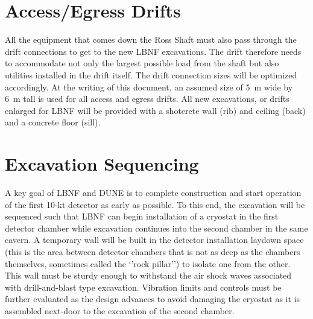 \section{Access/Egress Drifts}
\label{sec:fscf-excav-access-drifts}

All the equipment that comes down the Ross Shaft must also pass through the drift connections to get to the new LBNF excavations. The drift therefore needs to accommodate not only the largest possible load from the shaft but also utilities installed in the drift itself. The drift connection sizes will be optimized accordingly. 
At the writing of this document, an assumed size of 5~m wide by 6~m tall is used for all access and egress drifts. All new excavations, or drifts enlarged for LBNF will be provided with a shotcrete wall (rib) and ceiling (back) and a concrete floor (sill).

\section{Excavation Sequencing}
\label{sec:fscf-excav-exc-seq}

A key goal of LBNF and DUNE is to complete construction and start operation of the first 10-kt detector as early as possible. To %
this end, the excavation will be sequenced such that LBNF can begin installation of a cryostat in the first detector chamber while excavation continues into the second chamber in the same cavern.  A temporary wall will be built in the detector installation laydown space (this is the area between detector chambers that is not as deep as the chambers themselves, sometimes called the `'rock pillar'') to isolate one  from the other. 
This wall must be %
sturdy enough to withstand the air shock waves associated with drill-and-blast type %
excavation.  %
Vibration limits and controls must be further evaluated %
as the design advances to avoid damaging the cryostat as it is assembled next-door to the excavation of the second chamber.

